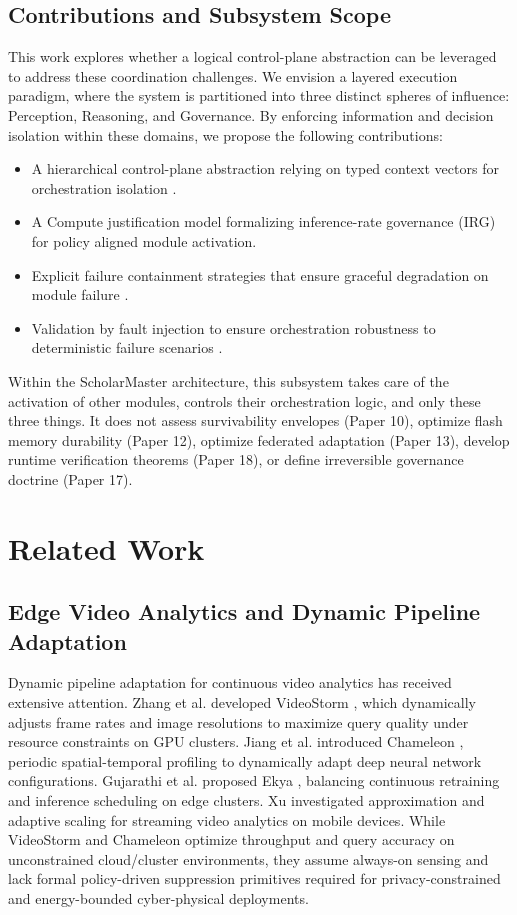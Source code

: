 \documentclass[conference]{IEEEtran}
\begin{document}
\subsection{Contributions and Subsystem Scope}
This work explores whether a logical control-plane abstraction can be leveraged to address these coordination challenges. We envision a layered execution paradigm, where the system is partitioned into three distinct spheres of influence: Perception, Reasoning, and Governance. By enforcing information and decision isolation within these domains, we propose the following contributions:
\begin{itemize}
    \item A hierarchical control-plane abstraction relying on typed context vectors for orchestration isolation \cite{b17}.
    \item A Compute justification model formalizing inference-rate governance (IRG) for policy aligned module activation.
    \item Explicit failure containment strategies that ensure graceful degradation on module failure \cite{b18}.
    \item Validation by fault injection to ensure orchestration robustness to deterministic failure scenarios \cite{b28}.
\end{itemize}

Within the ScholarMaster architecture, this subsystem takes care of the activation of other modules, controls their orchestration logic, and only these three things. It does not assess survivability envelopes (Paper 10), optimize flash memory durability (Paper 12), optimize federated adaptation \cite{b8} (Paper 13), develop runtime verification theorems (Paper 18), or define irreversible governance doctrine (Paper 17).

\section{Related Work}

\subsection{Edge Video Analytics and Dynamic Pipeline Adaptation}
Dynamic pipeline adaptation for continuous video analytics has received extensive attention. Zhang et al. developed VideoStorm \cite{b33}, which dynamically adjusts frame rates and image resolutions to maximize query quality under resource constraints on GPU clusters. Jiang et al. introduced Chameleon \cite{b34}, periodic spatial-temporal profiling to dynamically adapt deep neural network configurations. Gujarathi et al. proposed Ekya \cite{b35}, balancing continuous retraining and inference scheduling on edge clusters. Xu investigated approximation and adaptive scaling \cite{b36} for streaming video analytics on mobile devices. While VideoStorm and Chameleon optimize throughput and query accuracy on unconstrained cloud/cluster environments, they assume always-on sensing and lack formal policy-driven suppression primitives required for privacy-constrained and energy-bounded cyber-physical deployments.
\end{document}

